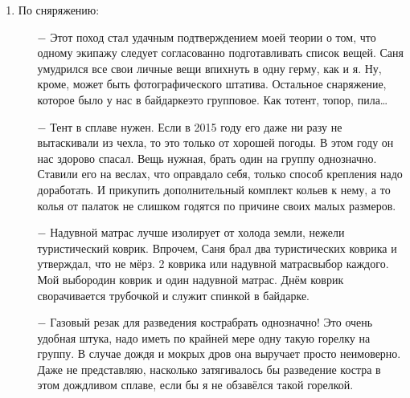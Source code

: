 \begin{enumerate}
\begin{enumerate}
	\item[$-$] 6 человек\mdash предельное количество народа, когда кончается порядок и начинается хаос. У нас был порядок, чему я несказанно рад. Все экипажи показали себя с лучшей стороны, преодолевая все встретившиеся нам трудности.
	\item[$-$] Ребенку одному в походе было скучновато. Лучше, если детей будет несколько. Тогда они организуют «междусобойчик». Сколько радости принесет им поход сознанием того, что взрослые взяли их на такое мероприятие!
	\item[$-$] Опыт чисто мужского похода показывает, что женщин с собой всё\sdash таки надо брать. В их присутствии мужчины стараются не выражаться крепко и вообще ведут себя по\sdash другому. Но и не надо забывать о сказанном Феликсом Квадригиным про женщин в походе. Впрочем, я хочу дополнить его слова о том, что женщины привносят хаос. Это, по моему мнению, касается незамужних дам. Замужние, обычно, пытаются командовать только своими мужьями, а не всеми подряд. Тут уже наше мужское дело давать этому отпор.
	\end{enumerate}	
\item По сняряжению:
	\begin{enumerate}
		\item[$-$] Этот поход стал удачным подтверждением моей теории о том, что одному экипажу следует согласованно подготавливать список вещей. Саня умудрился все свои личные вещи впихнуть в одну герму, как и я. Ну, кроме, может быть фотографического штатива. Остальное снаряжение, которое было у нас в байдарке\mdash это групповое. Как то\mdash тент, топор, пила…
		\item[$-$] Тент в сплаве нужен. Если в 2015 году его даже ни разу не вытаскивали из чехла, то это только от хорошей погоды. В этом году он нас здорово спасал. Вещь нужная, брать один на группу однозначно. Ставили его на веслах, что оправдало себя, только способ крепления надо доработать. И прикупить дополнительный комплект кольев к нему, а то колья от палаток не слишком годятся по причине своих малых размеров.
		\item[$-$] Надувной матрас лучше изолирует от холода земли, нежели туристический коврик. Впрочем, Саня брал два туристических коврика и утверждал, что не мёрз. 2 коврика или надувной матрас\mdash выбор каждого. Мой выбор\mdash один коврик и один надувной матрас. Днём коврик сворачивается трубочкой и служит спинкой в байдарке.
		\item[$-$] Газовый резак для разведения костра\mdash брать однозначно! Это очень удобная штука, надо иметь по крайней мере одну такую горелку на группу. В случае дождя и мокрых дров она выручает просто неимоверно. Даже не представляю, насколько затягивалось бы разведение костра в этом дождливом сплаве, если бы я не обзавёлся такой горелкой.

\end{enumerate}
\end{enumerate}
